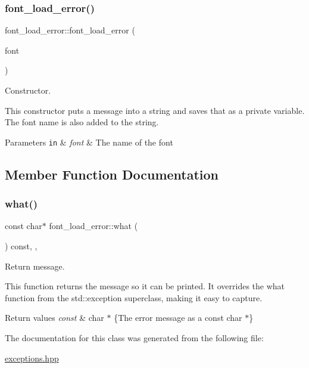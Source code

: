 \subsubsection{\texorpdfstring{font\+\_\+load\+\_\+error()}{font\_load\_error()}}
{\footnotesize\ttfamily font\+\_\+load\+\_\+error\+::font\+\_\+load\+\_\+error (\begin{DoxyParamCaption}\item[{const std\+::string}]{font }\end{DoxyParamCaption})\hspace{0.3cm}{\ttfamily [inline]}}



Constructor. 

This constructor puts a message into a string and saves that as a private variable. The font name is also added to the string.


\begin{DoxyParams}[1]{Parameters}
\mbox{\tt in}  & {\em font} & The name of the font \\
\hline
\end{DoxyParams}


\subsection{Member Function Documentation}
\mbox{\label{classfont__load__error_a17c3014c5953ab5863585e4cbf8865c3}} 
\subsubsection{\texorpdfstring{what()}{what()}}
{\footnotesize\ttfamily const char$\ast$ font\+\_\+load\+\_\+error\+::what (\begin{DoxyParamCaption}{ }\end{DoxyParamCaption}) const\hspace{0.3cm}{\ttfamily [inline]}, {\ttfamily [override]}, {\ttfamily [noexcept]}}



Return message. 

This function returns the message so it can be printed. It overrides the what function from the std\+::exception superclass, making it easy to capture.


\begin{DoxyRetVals}{Return values}
{\em const} & char $\ast$ \{The error message as a const char $\ast$\} \\
\hline
\end{DoxyRetVals}


The documentation for this class was generated from the following file\+:\begin{DoxyCompactItemize}
\item 
\hyperlink{exceptions_8hpp}{exceptions.\+hpp}\end{DoxyCompactItemize}
